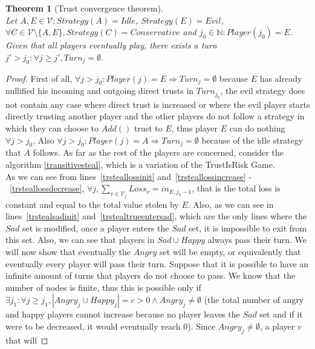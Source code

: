 \documentclass[11pt]{article}
\newtheorem{theorem}{Theorem}[section]
\theoremstyle{definition}
\theoremstyle{corollary}
\theoremstyle{lemma}
\begin{document}
    \begin{theorem}[Trust convergence theorem] \ \\
       \label{convergence}
       Let $A,E \in \mathcal{V} : Strategy(A) = Idle$, $Strategy(E) = Evil$, $\forall C \in \mathcal{V} \setminus \{A,E\},
       Strategy(C) = Conservative$ and $j_0 \in \mathbb{N} : Player(j_0) = E$. Given that all players eventually play, there
       exists a turn $j' > j_0 : \forall j \geq j', Turn_j = \emptyset$.
    \end{theorem}
    \begin{proof}
       First of all, $\forall j > j_0 : Player(j) = E \Rightarrow Turn_j = \emptyset$ because $E$ has already nullified his
       incoming and outgoing direct trusts in $Turn_{j_0}$, the evil strategy does not contain any case where direct trust is
       increased or where the evil player starts directly trusting another player and the other players do not follow a
       strategy in which they can choose to $Add()$ trust to $E$, thus player $E$ can do nothing $\forall j > j_0$. Also
       $\forall j > j_0 : Player(j) = A \Rightarrow Turn_j = \emptyset$ because of the idle strategy that $A$ follows. As far
       as the rest of the players are concerned, consider the algorithm \ref{transitivesteal}, which is a variation of the
       TrustIsRisk Game. \\
       As we can see from lines~\ref{trsteallossinit} and~\ref{trsteallossincrease} -~\ref{trsteallossdecrease}, $\forall j,
       \sum\limits_{v \in \mathcal{V}_j}Loss_v = in_{E, j_0-1}$, that is the total loss is constant and equal to the total
       value stolen by $E$. Also, as we can see in lines~\ref{trstealsadinit} and~\ref{trstealtrueentersad}, which are the
       only lines where the $Sad$ set is modified, once a player enters the $Sad$ set, it is impossible to exit from this
       set. Also, we can see that players in $Sad \cup Happy$ always pass their turn. We will now show that eventually the
       $Angry$ set will be empty, or equivalently that eventually every player will pass their turn. Suppose that it is
       possible to have an infinite amount of turns that players do not choose to pass. We know that the number of nodes is
       finite, thus this is possible only if $\exists j_1: \forall j \geq j_1, |Angry_j \cup Happy_j| = c > 0 \wedge Angry_j
       \neq \emptyset$ (the total number of angry and happy players cannot increase because no player leaves the $Sad$ set
       and if it were to be decreased, it would eventually reach 0). Since $Angry_j \neq \emptyset$, a player $v$ that will

\end{proof}
\end{document}
